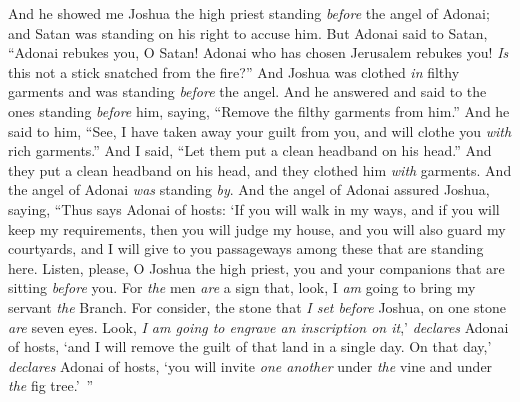 \begin{biblechapter} %
 And he showed me Joshua the high priest standing \textit{before} the angel of Adonai; and Satan was standing on his right to accuse him.
\verse But Adonai said to Satan, “Adonai rebukes you, O Satan! Adonai who has chosen Jerusalem rebukes you! \textit{Is} this not a stick snatched from the fire?”
\verse And Joshua was clothed \textit{in} filthy garments and was standing \textit{before} the angel.
\verse And he answered and said to the ones standing \textit{before} him, saying, “Remove the filthy garments from him.” And he said to him, “See, I have taken away your guilt from you, and will clothe you \textit{with} rich garments.”
\verse And I said, “Let them put a clean headband on his head.” And they put a clean headband on his head, and they clothed him \textit{with} garments. And the angel of Adonai \textit{was} standing \textit{by}.
\verse And the angel of Adonai assured Joshua, saying,
\verse “Thus says Adonai of hosts: ‘If you will walk in my ways, and if you will keep my requirements, then you will judge my house, and you will also guard my courtyards, and I will give to you passageways among these that are standing here.
\verse Listen, please, O Joshua the high priest, you and your companions that are sitting \textit{before} you. For \textit{the} men \textit{are} a sign that, look, I \textit{am} going to bring my servant \textit{the} Branch.
\verse For consider, the stone that \textit{I set before} Joshua, on one stone \textit{are} seven eyes. Look, \textit{I am going to engrave an inscription on it},’ \textit{declares} Adonai of hosts, ‘and I will remove the guilt of that land in a single day.
\verse On that day,’ \textit{declares} Adonai of hosts, ‘you will invite \textit{one another} under \textit{the} vine and under \textit{the} fig tree.’ ”
\end{biblechapter}


